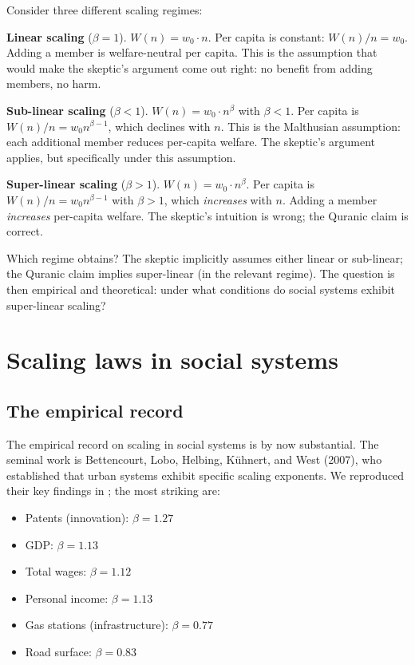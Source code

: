 Consider three different scaling regimes:

\textbf{Linear scaling} ($\beta = 1$). $W(n) = w_0 \cdot n$. Per
capita is constant: $W(n)/n = w_0$. Adding a member is welfare-neutral
per capita. This is the assumption that would make the skeptic's
argument come out right: no benefit from adding members, no harm.

\textbf{Sub-linear scaling} ($\beta < 1$). $W(n) = w_0 \cdot n^\beta$
with $\beta < 1$. Per capita is $W(n)/n = w_0 n^{\beta - 1}$, which
declines with $n$. This is the Malthusian assumption: each
additional member reduces per-capita welfare. The skeptic's
argument applies, but specifically under this assumption.

\textbf{Super-linear scaling} ($\beta > 1$). $W(n) = w_0 \cdot n^\beta$.
Per capita is $W(n)/n = w_0 n^{\beta - 1}$ with $\beta > 1$, which
\emph{increases} with $n$. Adding a member \emph{increases}
per-capita welfare. The skeptic's intuition is wrong; the Quranic
claim is correct.

Which regime obtains? The skeptic implicitly assumes either linear
or sub-linear; the Quranic claim implies super-linear (in the
relevant regime). The question is then empirical and theoretical:
under what conditions do social systems exhibit super-linear
scaling?

\section{Scaling laws in social systems}
\label{sec:network-scaling-laws}

\subsection{The empirical record}

The empirical record on scaling in social systems is by now
substantial. The seminal work is Bettencourt, Lobo, Helbing,
K\"uhnert, and West (2007), who established that urban systems
exhibit specific scaling exponents. We reproduced their key
findings in ; the most striking are:

\begin{itemize}[leftmargin=2em]
    \item Patents (innovation): $\beta = 1.27$
    \item GDP: $\beta = 1.13$
    \item Total wages: $\beta = 1.12$
    \item Personal income: $\beta = 1.13$
    \item Gas stations (infrastructure): $\beta = 0.77$
    \item Road surface: $\beta = 0.83$
\end{itemize}

